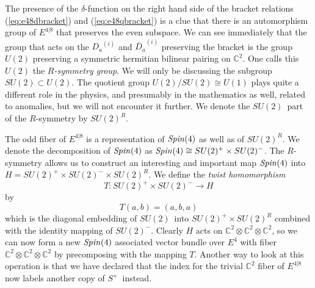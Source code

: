 \documentclass[twoside]{amsart}
\newcommand{\CC}{\ensuremath{\mathbb{C}}}
\renewcommand{\eqref}[1]{(\ref{eq:#1})}
\newcommand{\enm}[1]{\ensuremath{#1}}
\newcommand{\superijk}[3]{\enm{{#1}^{#2|#3}}}
\newcommand{\rrij}[2]{\superijk{E}{#1}{#2}}
\renewcommand{\bar}[1]{\overline{#1}}
\newcommand{\spin}{\enm{\mathrm{\it Spin}}}
\newcommand{\cjsub}[2]{\enm{\bar#1{} _{{\dot{#2 }}}}} %
\newcommand{\odi}[1]{\enm{D_{#1}}}
\newcommand{\odicj}[1]{\enm{\cjsub{D}{#1}}}
\newcommand{\oda}{\odi{a}}
\newcommand{\odacj}{\odicj{a}}
\newcommand{\onetwoij}[2]{\enm{#1^{(#2)}}}
\newcommand{\onetwoi}[1]{\onetwoij{#1}{i}}
\newcommand{\sut}{\enm{SU(2)}}
\newcommand{\spl}{\enm{S^{+}}}
\begin{document}
The presence of the \( \delta \)-function on the right hand side of
the bracket relations \eqref{e48dbracket} and \eqref{e48qbracket} is a
clue that there is an automorphism group of \rrij{4}{8} that preserves
the even subspace.  We can see immediately that the group that acts on
the \onetwoi{\oda} and \onetwoi{\odacj} preserving the bracket is the
group \( U(2) \) preserving a symmetric hermitian bilinear pairing on
\( \CC^{2} \).  One calls this \( U(2) \) the \emph{\( R \)-symmetry
group}.  We will only be discussing the subgroup \( \sut\subset U(2). \)
The quotient group \( U(2)/\sut\cong U(1) \) plays quite a different
role in the physics, and presumably in the mathematics as well, related
to anomalies, but we will not encounter it further.  We denote the \sut\
part of the \(R\)-symmetry by \(\sut^R\).


The odd fiber of \rrij{4}{8} is a representation of \(\spin(4)\) as well as of
\(\sut^R\).
We denote the decomposition of \( \spin(4) \) as \( \spin(4)\cong
\sut^+\times\sut^- \).
The \( R \)-symmetry
allows us to construct an interesting and important map \( \spin(4) \) into \( H =
\sut^{+}\times\sut^{-} \times\sut^{R} \). We define the \emph{twist
homomorphism}
\[ T:\sut^{+}\times\sut^{-} \to H \]
by
\begin{equation}
    T(a, b) = (a, b, a)
    \label{eq:twist}
\end{equation}
which is the diagonal embedding of \sut\ into \(
\sut^{+}\times\sut^{R}
\) combined with the identity mapping of \( \sut^{-} \).
Clearly \(H\) acts on \( \CC^2\otimes\CC^2\otimes\CC^2 \), so we can now form a new \( \spin(4) \) associated vector bundle over \(E^4\) with fiber \( \CC^2\otimes\CC^2\otimes\CC^2 \) by precomposing with the mapping \( T \).
Another way
to look at this operation is that we have declared that the index for
the trivial \( \CC^{2} \) fiber of \rrij{4}{8} now labels another copy of \spl\ instead.
\end{document}

